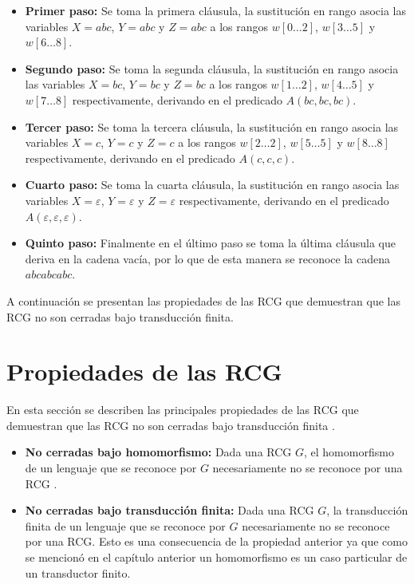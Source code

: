 \begin{itemize}
    \item \textbf{Primer paso:} Se toma la primera cláusula, la sustitución en rango asocia las variables
          $X=abc$, $Y=abc$ y $Z=abc$ a los rangos $w[0\dots 2]$, $w[3\dots 5]$ y $w[6\dots 8]$.
    \item \textbf{Segundo paso:} Se toma la segunda cláusula, la sustitución en rango asocia las variables $X=bc$, $Y=bc$ y $Z=bc$ a los rangos $w[1\dots 2]$,
          $w[4\dots 5]$ y $w[7\dots 8]$ respectivamente, derivando en el predicado $A(bc,bc,bc)$.
    \item \textbf{Tercer paso:} Se toma la tercera cláusula, la sustitución en rango asocia las variables $X=c$, $Y=c$ y $Z=c$ a los
          rangos $w[2\dots 2]$, $w[5\dots 5]$ y $w[8\dots 8]$ respectivamente, derivando en el predicado $A(c,c,c)$.
    \item \textbf{Cuarto paso:} Se toma la cuarta cláusula, la sustitución en rango asocia las variables
          $X=\varepsilon$, $Y=\varepsilon$ y $Z=\varepsilon$ respectivamente, derivando en el predicado
          $A(\varepsilon,\varepsilon,\varepsilon)$.
    \item \textbf{Quinto paso:} Finalmente en el último paso se toma la última
          cláusula que deriva en la cadena vacía, por lo que de esta manera se reconoce la cadena $abcabcabc$.
\end{itemize}

A continuación se presentan las propiedades de las RCG que demuestran que las RCG no son cerradas
bajo transducción finita.

\section{Propiedades de las RCG}

En esta sección se describen las principales propiedades de las RCG que demuestran que las RCG no 
son cerradas bajo transducción finita \cite{propertiesRCGBib}.

\begin{itemize}
    \item  \textbf{No cerradas bajo homomorfismo:} Dada una RCG $G$, el homomorfismo de un lenguaje que se reconoce por $G$ necesariamente no se reconoce por una RCG \cite{propertiesRCGBib}.
    \item \textbf{No cerradas bajo transducción finita:} Dada una RCG $G$, la transducción finita de un lenguaje que se reconoce por $G$ necesariamente no se reconoce por una RCG.  Esto es una consecuencia de la propiedad anterior ya que como se mencionó en el capítulo anterior un homomorfismo es un caso particular de un transductor finito.
\end{itemize}


